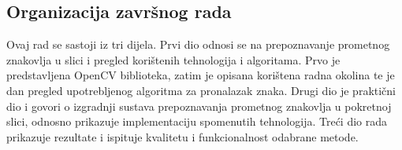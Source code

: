 \subsection{Organizacija završnog rada} %
\label{sub:Organizacija završnog rada}
Ovaj rad se sastoji iz tri dijela. Prvi dio odnosi se na prepoznavanje prometnog znakovlja u slici i pregled
korištenih tehnologija i algoritama. Prvo je predstavljena OpenCV
biblioteka, zatim je opisana korištena radna okolina te je dan pregled
upotrebljenog algoritma za pronalazak znaka. Drugi dio je praktični
dio i govori o izgradnji sustava prepoznavanja prometnog znakovlja u pokretnoj slici, odnosno prikazuje implementaciju spomenutih tehnologija. Treći dio rada
prikazuje rezultate i ispituje kvalitetu i funkcionalnost odabrane
metode.